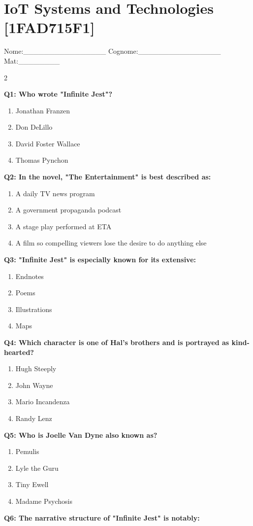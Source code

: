 \documentclass[10pt]{article}
\begin{document}
\section*{IoT Systems and Technologies \footnotesize [1FAD715F1]}
{\footnotesize Nome:\_\_\_\_\_\_\_\_\_\_\_\_\_\_\_\_ Cognome:\_\_\_\_\_\_\_\_\_\_\_\_\_\_\_\_ Mat:\_\_\_\_\_\_\_\_}
\begin{multicols}{2}

\textbf{Q1: Who wrote "Infinite Jest"?}

\begin{enumerate}[label=\arabic*.]
\item Jonathan Franzen
\item Don DeLillo
\item David Foster Wallace
\item Thomas Pynchon
\end{enumerate}
\textbf{Q2: In the novel, "The Entertainment" is best described as:}

\begin{enumerate}[label=\arabic*.]
\item A daily TV news program
\item A government propaganda podcast
\item A stage play performed at ETA
\item A film so compelling viewers lose the desire to do anything else
\end{enumerate}
\textbf{Q3: "Infinite Jest" is especially known for its extensive:}

\begin{enumerate}[label=\arabic*.]
\item Endnotes
\item Poems
\item Illustrations
\item Maps
\end{enumerate}
\textbf{Q4: Which character is one of Hal's brothers and is portrayed as kind-hearted?}

\begin{enumerate}[label=\arabic*.]
\item Hugh Steeply
\item John Wayne
\item Mario Incandenza
\item Randy Lenz
\end{enumerate}
\textbf{Q5: Who is Joelle Van Dyne also known as?}

\begin{enumerate}[label=\arabic*.]
\item Pemulis
\item Lyle the Guru
\item Tiny Ewell
\item Madame Psychosis
\end{enumerate}
\textbf{Q6: The narrative structure of "Infinite Jest" is notably:}


\end{multicols}
\end{document}
